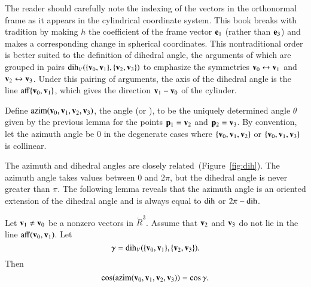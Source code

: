 \begin{remark}
The reader should carefully note the indexing of the vectors in the
orthonormal frame as it appears in the cylindrical coordinate system.
This book breaks with tradition by making $h$ the coefficient of the
frame vector ${\mathbf e}_1$ (rather than ${\mathbf e}_3$) and makes a corresponding
change in spherical coordinates.  This nontraditional order is better
suited to the definition of dihedral angle, the arguments of which 
 are grouped in pairs $\operatorname{dih}_V(\{{\mathbf v}_0,{\mathbf v}_1\},\{{\mathbf v}_2,{\mathbf v}_3\})$
to emphasize the symmetries
${\mathbf v}_0\leftrightarrow{\mathbf v}_1$ and ${\mathbf v}_2\leftrightarrow{\mathbf v}_3$.  Under this pairing
of arguments, the axis of the dihedral angle is the line
${\operatorname{aff}}\{{\mathbf v}_0,{\mathbf v}_1\}$, which gives the direction ${\mathbf v}_1-{\mathbf v}_0$ of the cylinder.
%
%
\end{remark}

\begin{definition}[azim]\label{def:azim}
  Define ${\operatorname{azim}}({\mathbf v}_0,{\mathbf v}_1,{\mathbf v}_2,{\mathbf v}_3)$, the  angle
  (or ), to be the uniquely determined angle
  $\theta$  given by the previous lemma for the points ${\mathbf p}_1={\mathbf v}_2$ and ${\mathbf p}_2={\mathbf v}_3$.
  By convention, let the azimuth angle be $0$ in the degenerate cases
  where $\{{\mathbf v}_0,{\mathbf v}_1,{\mathbf v}_2\}$ or $\{{\mathbf v}_0,{\mathbf v}_1,{\mathbf v}_3\}$ is collinear.
\end{definition}


The azimuth and dihedral angles are closely related~(Figure~\ref{fig:dih}).  The azimuth
angle
 takes values between $0$ and $2\pi$, but the dihedral angle is
never greater than $\pi$.  The following lemma reveals that the
azimuth angle is an oriented extension of the dihedral angle and is always
equal to $\operatorname{dih}$ or $2\pi - \operatorname{dih}$.  %
%
%
%

\begin{lemma}[]\label{lemma:dih-azim}
     Let
  ${\mathbf v}_1\ne {\mathbf v}_0$ be a nonzero vectors in $\ring{R}^3$.  Assume that
  ${\mathbf v}_2$ and ${\mathbf v}_3$ do not lie in the line ${\operatorname{aff}}({\mathbf v}_0,{\mathbf v}_1)$.  Let
\[ 
\gamma = \operatorname{dih}_V(\{{\mathbf v}_0,{\mathbf v}_1\},\{{\mathbf v}_2,{\mathbf v}_3\}).
\] 
Then
\[ 
\cos({\operatorname{azim}}({\mathbf v}_0,{\mathbf v}_1,{\mathbf v}_2,{\mathbf v}_3)) = \cos\gamma.
\] 
\end{lemma}

